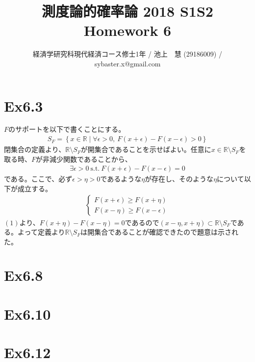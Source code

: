 \documentclass{article}
\begin{document}
\title{測度論的確率論 2018 S1S2 \\ 
Homework 6}
\author{経済学研究科現代経済コース修士1年 / 池上　慧 (29186009) / sybaster.x@gmail.com}
\maketitle

\section{Ex6.3}
$F$のサポートを以下で書くことにする。
\begin{align*}
	S_F = \left\{ x \in \mathbb{R} \mid \forall \epsilon > 0, \ F(x + \epsilon) - F(x - \epsilon) > 0 \right\}
\end{align*}
閉集合の定義より、$\mathbb{R} \setminus S_F$が開集合であることを示せばよい。任意に$x \in \mathbb{R} \setminus S_F$を取る時、$F$が非減少関数であることから、
\begin{align}
	\exists \epsilon > 0\ \text{s.t.}\ F(x + \epsilon) - F(x - \epsilon) = 0
\end{align}
である。ここで、必ず$\epsilon > \eta > 0$であるような$\eta$が存在し、そのような$\eta$について以下が成立する。
\begin{align*}
	\begin{cases}
	F(x + \epsilon) \geq F(x + \eta)\\
	F(x -\eta) \geq F(x -\epsilon)
	\end{cases}
\end{align*}
$(1)$より、$F(x + \eta) - F(x - \eta) = 0$であるので$(x-\eta, x+\eta) \subset \mathbb{R} \setminus S_F$である。よって定義より$\mathbb{R} \setminus S_F$は開集合であることが確認できたので題意は示された。

\section{Ex6.8}

\section{Ex6.10}

\section{Ex6.12}
\end{document}
